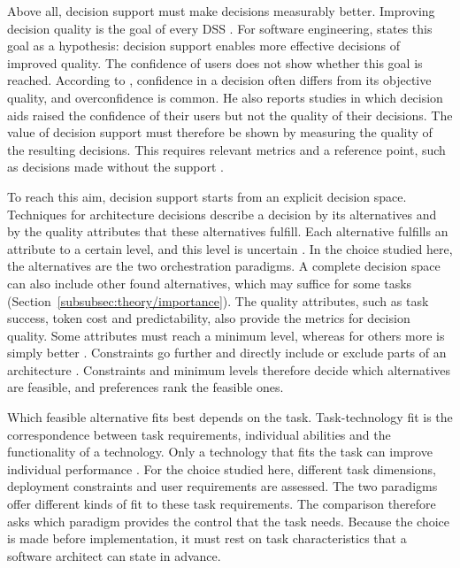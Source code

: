 Above all, decision support must make decisions measurably better. Improving decision quality is the goal of every DSS \parencite{kasperTheoryDecisionSupport1996}. For software engineering, \textcite{ruheSoftwareDesicionsupport} states this goal as a hypothesis: decision support enables more effective decisions of improved quality. The confidence of users does not show whether this goal is reached. According to \textcite{kasperTheoryDecisionSupport1996}, confidence in a decision often differs from its objective quality, and overconfidence is common. He also reports studies in which decision aids raised the confidence of their users but not the quality of their decisions. The value of decision support must therefore be shown by measuring the quality of the resulting decisions. This requires relevant metrics \parencite{article} and a reference point, such as decisions made without the support \parencite{ruheSoftwareDesicionsupport}.

To reach this aim, decision support starts from an explicit decision space. Techniques for architecture decisions describe a decision by its alternatives and by the quality attributes that these alternatives fulfill. Each alternative fulfills an attribute to a certain level, and this level is uncertain \parencite{falessiDecisionmakingTechniquesSoftware2011}. In the choice studied here, the alternatives are the two orchestration paradigms. A complete decision space can also include other found alternatives, which may suffice for some tasks (Section~\ref{subsubsec:theory/importance}). The quality attributes, such as task success, token cost and predictability, also provide the metrics for decision quality. Some attributes must reach a minimum level, whereas for others more is simply better \parencite{falessiDecisionmakingTechniquesSoftware2011}. Constraints go further and directly include or exclude parts of an architecture \parencite{amellerLinkingQualityAttributes2012}. Constraints and minimum levels therefore decide which alternatives are feasible, and preferences rank the feasible ones. 

Which feasible alternative fits best depends on the task. Task-technology fit is the correspondence between task requirements, individual abilities and the functionality of a technology. Only a technology that fits the task can improve individual performance \parencite{goodhueTaskTechnologyFitIndividual1995}. For the choice studied here, different task dimensions, deployment constraints and user requirements are assessed. The two paradigms offer different kinds of fit to these task requirements. The comparison therefore asks which paradigm provides the control that the task needs. Because the choice is made before implementation, it must rest on task characteristics that a software architect can state in advance.

